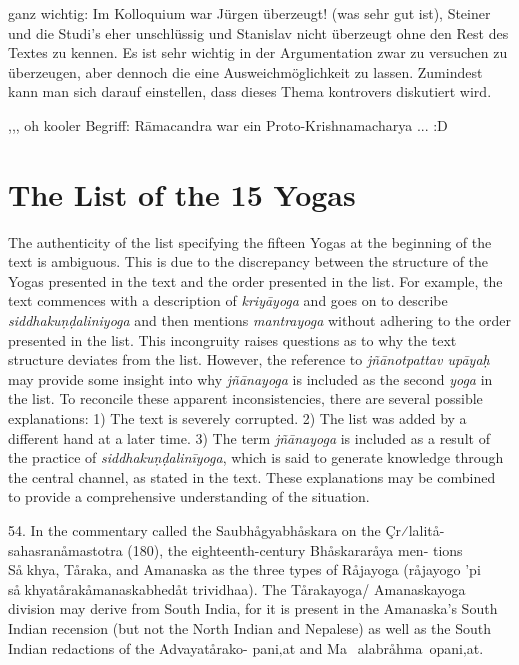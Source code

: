 ganz wichtig: Im Kolloquium war Jürgen überzeugt! (was sehr gut ist), Steiner und die Studi's eher unschlüssig und Stanislav nicht überzeugt ohne den Rest des Textes zu kennen. 
Es ist sehr wichtig in der Argumentation zwar zu versuchen zu überzeugen, aber dennoch die eine Ausweichmöglichkeit zu lassen. Zumindest kann man sich darauf einstellen, dass dieses Thema kontrovers diskutiert wird.

,,, oh kooler Begriff: Rāmacandra war ein Proto-Krishnamacharya ... :D 

\chapter{The List of the 15 Yogas}
\label{yogas_list}
The authenticity of the list specifying the fifteen Yogas at the beginning of the text is ambiguous. This is due to the discrepancy between the structure of the Yogas presented in the text and the order presented in the list. For example, the text commences with a description of \textit{kriyāyoga} and goes on to describe \textit{siddhakuṇḍaliniyoga} and then mentions \textit{mantrayoga} without adhering to the order presented in the list. This incongruity raises questions as to why the text structure deviates from the list. However, the reference to \textit{jñānotpattav upāyaḥ} may provide some insight into why \textit{jñānayoga} is included as the second \textit{yoga} in the list. To reconcile these apparent inconsistencies, there are several possible explanations: 1) The text is severely corrupted. 2) The list was added by a different hand at a later time. 3) The term \textit{jñānayoga} is included as a result of the practice of \textit{siddhakuṇḍalinīyoga}, which is said to generate knowledge through the central channel, as stated in the text. These explanations may be combined to provide a comprehensive understanding of the situation.



54. In the commentary called the Saubhågyabhåskara on the Çr⁄lalitå-
sahasranåmastotra (180), the eighteenth-century Bhåskararåya men-
tions Såkhya, Tåraka, and Amanaska as the three types of Råjayoga
(råjayogo ’pi såkhyatårakåmanaskabhedåt trividhaa). The Tårakayoga/
Amanaskayoga division may derive from South India, for it is present in
the Amanaska’s South Indian recension (but not the North Indian and
Nepalese) as well as the South Indian redactions of the Advayatårako-
pani‚at and Ma~alabråhma~opani‚at.

